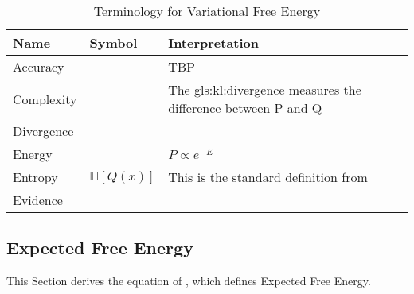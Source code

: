 \documentclass[]{article}
\begin{document}
\begin{table}[H]
	\begin{center}
		\caption{Terminology for Variational Free Energy}\label{table:terms:FE}
		\begin{tabular}{|l|l|p{8cm}|}\hline
			Name&Symbol&Interpretation\\ \hline
			Accuracy&&TBP\\ \hline
			Complexity&&The \gls{gls:kl:divergence} measures the difference between P and Q\\ \hline
			Divergence&&\\\hline
			Energy&&$P \propto e^{-E}$\\ \hline
			Entropy&$\mathbb{H}[Q(x)]$&This is the standard definition from \cite{shannon1949mathematical}\\ \hline
			Evidence&&\\ \hline
		\end{tabular}
	\end{center}
\end{table}

\subsection{Expected Free Energy}
This Section derives the equation of \cite[Section 2.6]{parr2022Active}, which defines Expected Free Energy.
\end{document}
